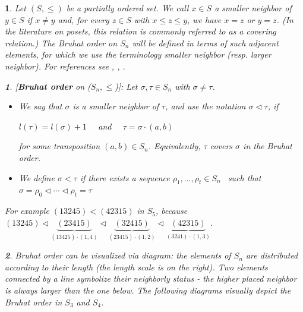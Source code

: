 \documentclass[a4 paper,12pt]{article}
\newcommand{\sma}{\triangleleft}
\newcommand{\ma}{\leqslant}
\newtheorem{numeris}{}[section]
\newtheorem{subnum}{}[numeris]
\begin{document}
\begin{numeris}
Let $(S,\leq)$ be a partially ordered set. We call $x\in S$ a \emph{smaller neighbor} of $y\in S$ if $x\neq y$ and, for every $z\in S$ with $x\leq z\leq y$, we have $x=z$ or $y=z$. (In the literature on posets, this relation is commonly referred to as a \emph{covering relation}.) The Bruhat order on $S_n$ will be defined in terms of such adjacent elements, for which we use the terminology \emph{smaller neighbor} (resp. \emph{larger neighbor}). For references see \cite[Chap. 2]{Bjor}, \cite[5.9-5.11]{Humph}, \cite[2.2]{Fed}.




\begin{subnum} [\textbf{Bruhat order} on ($S_{n}, \ma$)]: Let $\sigma,\tau \in S_{n}$ with $\sigma \neq \tau$.
\begin{itemize}
	\item  We say that   $\sigma$ is a \textit{smaller neighbor}  of $\tau$, and  use the notation $\sigma \sma \tau $,  if  
	\begin{center}
	  $l(\tau) = l(\sigma) +1$   \  \    and  \  \  $\tau =  \sigma \cdot  (a,b)$   
	\end{center}
	 for some transposition  $(a,b)\in S_n$. Equivalently, $\tau$ \emph{covers} $\sigma$ in the Bruhat order.
	\item We define $\sigma < \tau$   if there exists a sequence $\rho_1, \ldots , \rho_t \in S_n $ \ such that  \ 
$\sigma = \rho_0\sma \cdots \sma \rho_t = \tau$
\end{itemize}
 \label{Bruhat}
\end{subnum}
  


\begin{small}For example $(13245)< (42315)$ in $S_5$, because $(13245)\sma \underbrace{(23415)}_{(13425)\cdot  (1,4)}\sma\underbrace{(32415)}_{(23415)\cdot  (1,2)}\sma \underbrace{(42315)}_{(3241)\cdot  (1,3)}$.  \end{small}




\begin{subnum}  Bruhat order can be visualized via diagram: the elements of $S_n$ are distributed according to their
 length (the length scale is on the right). Two elements connected by a line symbolize their neighborly status - the higher placed neighbor is always 
larger than the one below.  The following diagrams visually depict the Bruhat order in  $S_3$ and $S_4$.
  \label{Bruhat_Visualisation} 
\end{subnum}
\label{Bruhat_Order_all}
\end{numeris}
  
\end{document}
